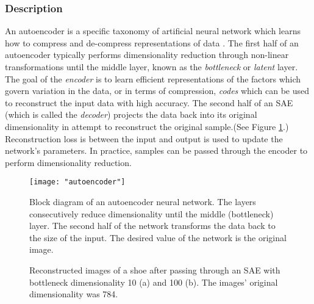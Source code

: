 \documentclass[conference]{IEEEtran}
\begin{document}
	 \subsubsection*{Description}
	 An autoencoder is a specific taxonomy of artificial neural network which learns how to  compress and de-compress representations of data \cite{Haykin2009NeuralNetworks,Goodfellow2016DeepLearning}. The first half of an autoencoder typically performs dimensionality reduction through non-linear transformations until the middle layer, known as the \textit{bottleneck} or \textit{latent} layer.  The goal of the \textit{encoder} is to learn efficient representations of the factors which govern variation in the data, or in terms of compression, \textit{codes} which can be used to reconstruct the input  data with high accuracy. The second half of an SAE (which is called the \textit{decoder}) projects the data back into its original dimensionality in attempt to reconstruct the original sample.(See Figure \ref{fig:autoencoder}.) Reconstruction loss is between the input and output is used to update the network's parameters.  In practice, samples can be passed through the encoder to perform dimensionality reduction. 
	 
	 \begin{center}
	  	\begin{figure}[t]
	  		\centering
	  		\texttt{[image: "autoencoder"]}
	  		\caption{Block diagram of an autoencoder neural network.  The layers consecutively reduce dimensionality until the middle (bottleneck) layer.  The second half of the network transforms the data back to the size of the input.  The desired value of the network is the original image.}
	  		\label{fig:autoencoder}
	  	\end{figure}
	  \end{center}
	 
  	\begin{figure}%
  		\centering
  		\qquad
  		\caption{Reconstructed images of a shoe after passing through an SAE with bottleneck dimensionality 10 (a) and 100 (b).  The images' original dimensionality was 784.}%
  		\label{fig:example}%
  	\end{figure}

  
\end{document}
